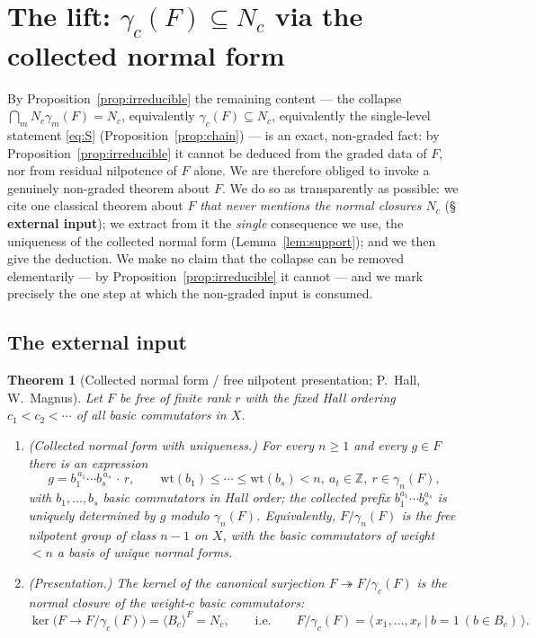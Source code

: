 \documentclass{amsart}
\newtheorem{theorem}{Theorem}
\theoremstyle{definition}
\theoremstyle{remark}
\begin{document}
\section{The lift: $\gamma_c(F)\subseteq N_c$ via the collected normal form}
\label{sec:lift}

By Proposition~\ref{prop:irreducible} the remaining content --- the collapse
$\bigcap_m N_c\gamma_m(F)=N_c$, equivalently $\gamma_c(F)\subseteq N_c$, equivalently the
single-level statement \eqref{eq:S} (Proposition~\ref{prop:chain}) --- is an exact,
non-graded fact: by Proposition~\ref{prop:irreducible} it cannot be deduced from the graded
data of $F$, nor from residual nilpotence of $F$ alone. We are therefore obliged to invoke a
genuinely non-graded theorem about $F$. We do so as transparently as possible: we cite one
classical theorem about $F$ \emph{that never mentions the normal closures $N_c$}
(\S\,\textbf{external input}); we extract from it the \emph{single} consequence we use, the
uniqueness of the collected normal form (Lemma~\ref{lem:support}); and we then give the
deduction. We make no claim that the collapse can be removed elementarily --- by
Proposition~\ref{prop:irreducible} it cannot --- and we mark precisely the one step at which
the non-graded input is consumed.

\subsection*{The external input}

\begin{theorem}[Collected normal form / free nilpotent presentation; P.~Hall, W.~Magnus]
\label{thm:collection}
Let $F$ be free of finite rank $r$ with the fixed Hall ordering $c_1<c_2<\cdots$ of all basic
commutators in $X$.
\begin{enumerate}
\item[\textup{(NF)}] \textup{(Collected normal form with uniqueness.)} For every $n\ge1$ and
every $g\in F$ there is an expression
\begin{equation}\label{eq:nf}
g=b_{1}^{\,a_1}\cdots b_{s}^{\,a_s}\,\cdot\,r,\qquad
\mathrm{wt}(b_1)\le\cdots\le\mathrm{wt}(b_s)<n,\ a_t\in\mathbb Z,\ r\in\gamma_n(F),
\end{equation}
with $b_1,\dots,b_s$ basic commutators in Hall order; the collected prefix
$b_1^{a_1}\cdots b_s^{a_s}$ is \emph{uniquely determined by $g$ modulo $\gamma_n(F)$}.
Equivalently, $F/\gamma_n(F)$ is the free nilpotent group of class $n-1$ on $X$, with the
basic commutators of weight $<n$ a basis of unique normal forms.
\item[\textup{(PR)}] \textup{(Presentation.)} The kernel of the canonical surjection
$F\twoheadrightarrow F/\gamma_c(F)$ is the normal closure of the weight-$c$ basic commutators:
\[
\ker\!\big(F\to F/\gamma_c(F)\big)=\langle B_c\rangle^{F}=N_c,
\qquad\text{i.e.}\qquad
F/\gamma_c(F)=\big\langle\,x_1,\dots,x_r\ \big|\ b=1\ (b\in B_c)\,\big\rangle .
\]
\end{enumerate}
\end{theorem}
\end{document}
